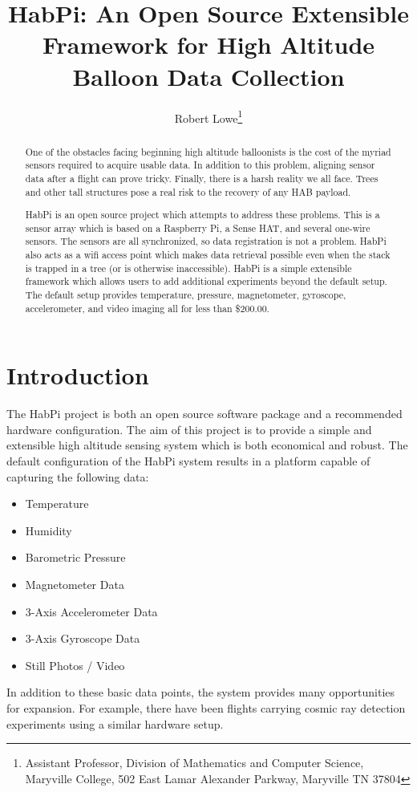 \documentclass[journal]{new-aiaa}
\title{HabPi: An Open Source Extensible Framework for High Altitude
Balloon Data Collection}
\author{Robert Lowe\footnote{Assistant Professor, Division of
Mathematics and Computer Science, Maryville College, 502 East Lamar
Alexander Parkway, Maryville TN 37804}}
\affil{Maryville College}
\begin{document}
\maketitle

\begin{abstract}
One of the obstacles facing beginning high altitude balloonists
is the cost of the myriad sensors required to acquire usable data.
In addition to this problem, aligning sensor data after a flight can
prove tricky.  Finally, there is a harsh reality we all face.  Trees
and other tall structures pose a real risk to the recovery of any HAB
payload.

HabPi is an open source project which attempts to address these
problems.  This is a sensor array which is based on a Raspberry Pi,
a Sense HAT, and several one-wire sensors.  The sensors are all
synchronized, so data registration is not a problem.  HabPi also acts
as a wifi access point which makes data retrieval possible even when
the stack is trapped in a tree (or is otherwise inaccessible).  HabPi
is a simple extensible framework which allows users to add additional
experiments beyond the default setup.  The default setup provides
temperature, pressure, magnetometer, gyroscope, accelerometer, and
video imaging all for less than \$200.00.
\end{abstract}

\section{Introduction}
The HabPi project is both an open source software package and
a recommended hardware configuration.  The aim of this project is to
provide a simple and extensible high altitude sensing system which is
both economical and robust. The default configuration of the HabPi
system results in a platform capable of capturing the following data:
\begin{itemize}
    \item Temperature
    \item Humidity
    \item Barometric Pressure
    \item Magnetometer Data
    \item 3-Axis Accelerometer Data
    \item 3-Axis Gyroscope Data
    \item Still Photos / Video
\end{itemize}
In addition to these basic data points, the system provides many
opportunities for expansion.  For example, there have been flights
carrying cosmic ray detection experiments using a similar hardware
setup.  
\end{document}
